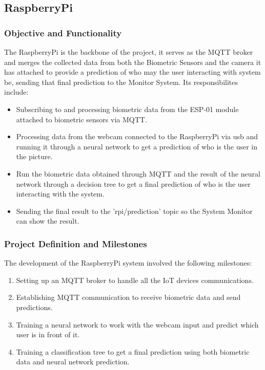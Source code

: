 \subsection{RaspberryPi}

\subsubsection{Objective and Functionality}
The RaspberryPi is the backbone of the project, it serves as the MQTT broker and merges the collected data from both the Biometric Sensors and the camera it has attached to provide a prediction of who may the user interacting with system be, sending that final prediction to the Monitor System. Its responsibilites include:
\begin{itemize}
    \item Subscribing to and processing biometric data from the ESP-01 module attached to biometric sensors via MQTT.
    \item Processing data from the webcam connected to the RaspberryPi via usb and running it through a neural network to get a prediction of who is the user in the picture.
    \item Run the biometric data obtained through MQTT and the result of the neural network through a decision tree to get a final prediction of who is the user interacting with the system.
    \item Sending the final result to the 'rpi/prediction' topic so the System Monitor can show the result.
\end{itemize}

\subsubsection{Project Definition and Milestones}
The development of the RaspberryPi system involved the following milestones:
\begin{enumerate}
    \item Setting up an MQTT broker to handle all the IoT devices communications.
    \item Establishing MQTT communication to receive biometric data and send predictions.
    \item Training a neural network to work with the webcam input and predict which user is in front of it.
    \item Training a classification tree to get a final prediction using both biometric data and neural network prediction.
\end{enumerate}


